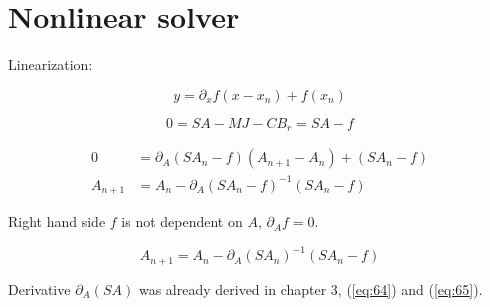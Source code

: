 \newpage
\chapter{Nonlinear solver}

\noindent Linearization:

\begin{equation} \label{eq:67} 
y = \partial_x f \left(x - x_n \right) + f \left(x_n\right)
\end{equation}

\begin{equation} \label{eq:68} 
0 = S A - M J - C B_r = S A - f
\end{equation}

\begin{align*} 
0 &= \partial_A \left(S A_n - f\right) \left(A_{n+1} - A_n \right) + \left(S A_n - f\right) \\
A_{n+1} &=  A_n  - \partial_A \left(S A_n - f\right)^{-1}  \left(S A_n - f\right)
\end{align*}

\noindent Right hand side $f$ is not dependent on $A$, $\partial_A f = 0$. 

\begin{equation} \label{eq:69} 
A_{n+1} = A_n - \partial_A \left(S A_n \right)^{-1}  \left(S A_n - f\right)
\end{equation}

\noindent Derivative $\partial_A \left(S A \right)$ was already derived in chapter 3, (\ref{eq:64}) and (\ref{eq:65}).



